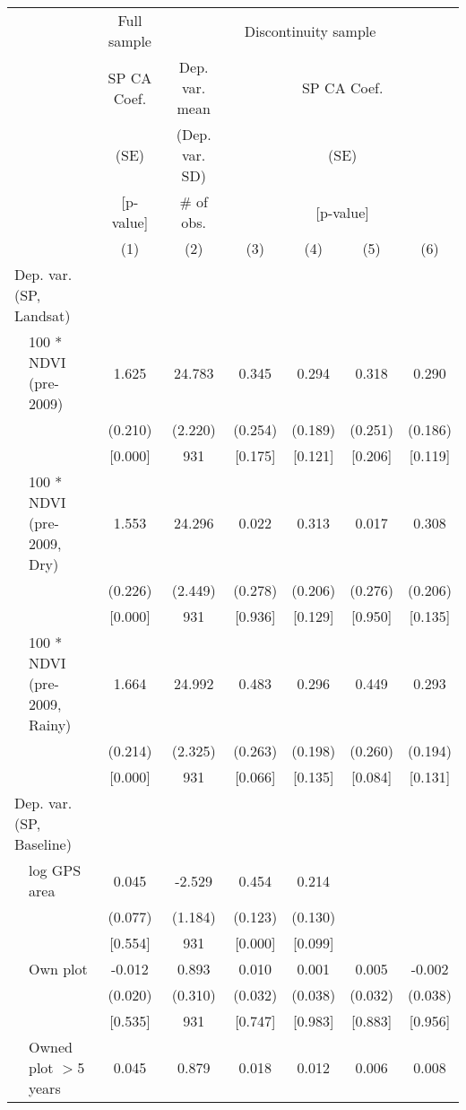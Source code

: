 \begin{tabular}{llcccccc}
\hline \hline
 & & \multicolumn{1}{c}{Full sample} & \multicolumn{5}{c}{Discontinuity sample} \\
\cmidrule(lr){3-3}\cmidrule(lr){4-8}
 & & \multicolumn{1}{c}{SP CA Coef.} & Dep. var. mean & \multicolumn{4}{c}{SP CA Coef.} \\
 & & \multicolumn{1}{c}{(SE)} & (Dep. var. SD) & \multicolumn{4}{c}{(SE)} \\
 & & \multicolumn{1}{c}{[p-value]} & \# of obs. & \multicolumn{4}{c}{[p-value]} \\
\cmidrule(lr){3-3}\cmidrule(lr){5-8}
 & & (1) & (2) & (3) & (4) & (5) & (6) \\
\hline
\multicolumn{2}{l}{Dep. var. (SP, Landsat)} & & & & & & \\
\cmidrule(lr){1-2}
 & 100 * NDVI (pre-2009) & 1.625 & 24.783 & 0.345 & 0.294 & 0.318 & 0.290 \\
 & & (0.210) & (2.220) & (0.254) & (0.189) & (0.251) & (0.186) \\
 & & [0.000] & 931 & [0.175] & [0.121] & [0.206] & [0.119] \\[0.5em]
 & 100 * NDVI (pre-2009, Dry) & 1.553 & 24.296 & 0.022 & 0.313 & 0.017 & 0.308 \\
 & & (0.226) & (2.449) & (0.278) & (0.206) & (0.276) & (0.206) \\
 & & [0.000] & 931 & [0.936] & [0.129] & [0.950] & [0.135] \\[0.5em]
 & 100 * NDVI (pre-2009, Rainy) & 1.664 & 24.992 & 0.483 & 0.296 & 0.449 & 0.293 \\
 & & (0.214) & (2.325) & (0.263) & (0.198) & (0.260) & (0.194) \\
 & & [0.000] & 931 & [0.066] & [0.135] & [0.084] & [0.131] \\[0.5em]
\multicolumn{2}{l}{Dep. var. (SP, Baseline)} & & & & & &  \\
\cmidrule(lr){1-2}
 & log GPS area & 0.045 & -2.529 & 0.454 & 0.214 &  &  \\
 & & (0.077) & (1.184) & (0.123) & (0.130) &  &  \\
 & & [0.554] & 931 & [0.000] & [0.099] &  &  \\[0.5em]
 & Own plot & -0.012 & 0.893 & 0.010 & 0.001 & 0.005 & -0.002 \\
 & & (0.020) & (0.310) & (0.032) & (0.038) & (0.032) & (0.038) \\
 & & [0.535] & 931 & [0.747] & [0.983] & [0.883] & [0.956] \\[0.5em]
 & Owned plot $>$5 years & 0.045 & 0.879 & 0.018 & 0.012 & 0.006 & 0.008 \\

\end{tabular}
